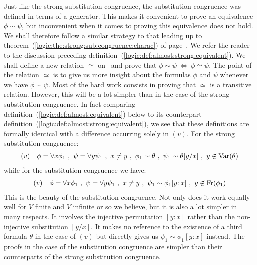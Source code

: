 Just like the strong substitution congruence, the substitution
congruence was defined in terms of a generator. This makes it
convenient to prove an equivalence $\phi\sim\psi$, but inconvenient
when it comes to proving this equivalence does not hold. We shall
therefore follow a similar strategy to that leading up to
theorem~(\ref{logic:the:strong:sub:congruence:charac}) of
page~\pageref{logic:the:strong:sub:congruence:charac}. We refer the
reader to the discussion preceding
definition~(\ref{logic:def:almost:strong:equivalent}). We shall
define a new relation $\simeq$ on \pv\ and prove that $\phi\sim\psi\
\Leftrightarrow\ \phi\simeq\psi$. The point of the relation $\simeq$
is to give us more insight about the formulas $\phi$ and $\psi$
whenever we have $\phi\sim\psi$. Most of the hard work consists in
proving that $\simeq$ is a transitive relation. However, this will
be a lot simpler than in the case of the strong substitution
congruence. In fact comparing
definition~(\ref{logic:def:almost:equivalent}) below to its
counterpart definition~(\ref{logic:def:almost:strong:equivalent}),
we see that these definitions are formally identical with a
difference occurring solely in $(v)$. For the strong substitution
congruence:
    \begin{eqnarray*}
    (v)&&\phi=\forall x\phi_{1}\ ,\ \psi=\forall y\psi_{1}\ ,\ x\neq y\ ,\
    \phi_{1}\sim \theta\ ,\ \psi_{1}\sim \theta[y/x]\ ,\ y\not\in\var(\theta)
    \end{eqnarray*}
while for the substitution congruence we have:
    \begin{eqnarray*}
    (v)&&\phi=\forall x\phi_{1}\ ,\ \psi=\forall y\psi_{1}\ ,\ x\neq y\ ,\
    \psi_{1}\sim \phi_{1}[y\!:\!x]\ ,\ y\not\in\free(\phi_{1})
    \end{eqnarray*}
This is the beauty of the substitution congruence. Not only does it
work equally well for $V$ finite and $V$ infinite or so we believe,
but it is also a lot simpler in many respects. It involves the
injective permutation $[y\!:\!x]$ rather than the non-injective
substitution $[y/x]$. It makes no reference to the existence of a
third formula $\theta$ in the case of $(v)$ but directly gives us
$\psi_{1}\sim \phi_{1}[y\!:\!x]$ instead. The proofs in the case of
the substitution congruence are simpler than their counterparts of
the strong substitution congruence.

